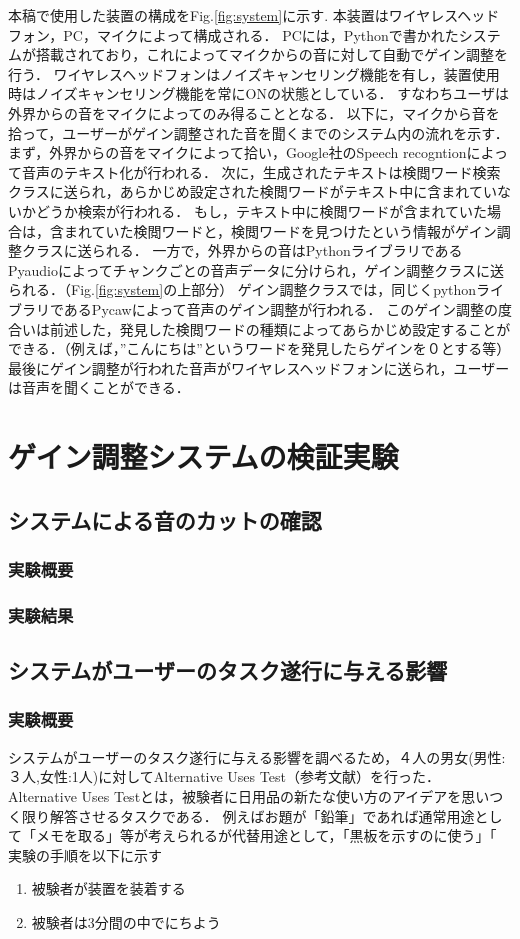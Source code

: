 \documentclass[a4paper]{jarticle}
\begin{document}
本稿で使用した装置の構成をFig.\ref{fig:system}に示す.
本装置はワイヤレスヘッドフォン，PC，マイクによって構成される．
PCには，Pythonで書かれたシステムが搭載されており，これによってマイクからの音に対して自動でゲイン調整を行う．
ワイヤレスヘッドフォンはノイズキャンセリング機能を有し，装置使用時はノイズキャンセリング機能を常にONの状態としている．
すなわちユーザは外界からの音をマイクによってのみ得ることとなる．
以下に，マイクから音を拾って，ユーザーがゲイン調整された音を聞くまでのシステム内の流れを示す．
まず，外界からの音をマイクによって拾い，Google社のSpeech recogntionによって音声のテキスト化が行われる．
次に，生成されたテキストは検閲ワード検索クラスに送られ，あらかじめ設定された検閲ワードがテキスト中に含まれていないかどうか検索が行われる．
もし，テキスト中に検閲ワードが含まれていた場合は，含まれていた検閲ワードと，検閲ワードを見つけたという情報がゲイン調整クラスに送られる．
一方で，外界からの音はPythonライブラリであるPyaudioによってチャンクごとの音声データに分けられ，ゲイン調整クラスに送られる．（Fig.\ref{fig:system}の上部分）
ゲイン調整クラスでは，同じくpythonライブラリであるPycawによって音声のゲイン調整が行われる．
このゲイン調整の度合いは前述した，発見した検閲ワードの種類によってあらかじめ設定することができる．（例えば，”こんにちは”というワードを発見したらゲインを０とする等）
最後にゲイン調整が行われた音声がワイヤレスヘッドフォンに送られ，ユーザーは音声を聞くことができる．

\section{ゲイン調整システムの検証実験}
\subsection{システムによる音のカットの確認}
\subsubsection{実験概要}
\subsubsection{実験結果}
\subsection{システムがユーザーのタスク遂行に与える影響}
\subsubsection{実験概要}
システムがユーザーのタスク遂行に与える影響を調べるため，４人の男女(男性:３人,女性:1人)に対してAlternative Uses Test（参考文献）を行った．
Alternative Uses Testとは，被験者に日用品の新たな使い方のアイデアを思いつく限り解答させるタスクである．
例えばお題が「鉛筆」であれば通常用途として「メモを取る」等が考えられるが代替用途として，「黒板を示すのに使う」「
実験の手順を以下に示す
\begin{enumerate}
    \item 被験者が装置を装着する
    \item 被験者は3分間の中でにちよう
\end{enumerate}
\end{document}
